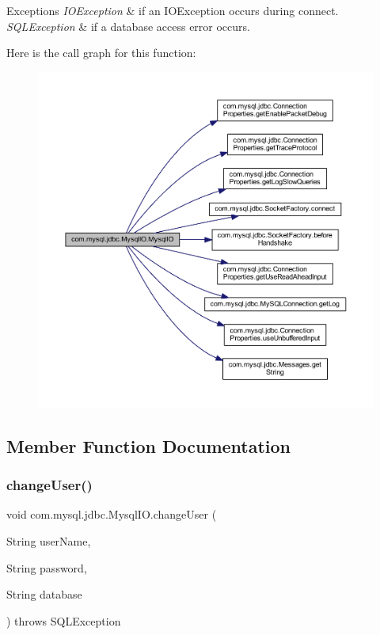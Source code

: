 \begin{DoxyExceptions}{Exceptions}
{\em I\+O\+Exception} & if an I\+O\+Exception occurs during connect. \\
\hline
{\em S\+Q\+L\+Exception} & if a database access error occurs. \\
\hline
\end{DoxyExceptions}
Here is the call graph for this function\+:
\nopagebreak
\begin{figure}[H]
\begin{center}
\leavevmode
\includegraphics[width=350pt]{classcom_1_1mysql_1_1jdbc_1_1_mysql_i_o_a9b4e102e11948b0b76701c1c3ce3a4a9_cgraph}
\end{center}
\end{figure}


\subsection{Member Function Documentation}
\mbox{\label{classcom_1_1mysql_1_1jdbc_1_1_mysql_i_o_a2b65fc2cb7cccdb5923da263d37019ad}} 
\subsubsection{\texorpdfstring{change\+User()}{changeUser()}}
{\footnotesize\ttfamily void com.\+mysql.\+jdbc.\+Mysql\+I\+O.\+change\+User (\begin{DoxyParamCaption}\item[{String}]{user\+Name,  }\item[{String}]{password,  }\item[{String}]{database }\end{DoxyParamCaption}) throws S\+Q\+L\+Exception\hspace{0.3cm}{\ttfamily [protected]}}


